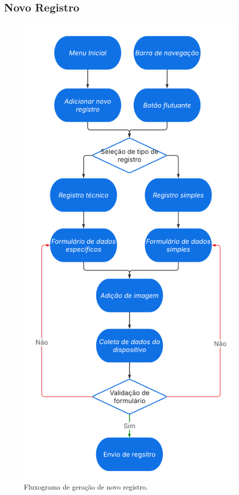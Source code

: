 \subsection{Novo Registro}

\begin{figure}[H]
    \centering
    \includegraphics[height=0.90\textheight]{diagrams/fluxograma_registro.pdf}
    \caption{Fluxograma de geração de novo registro.}
    \label{fig:fluxo-novo-registro}
\end{figure}

